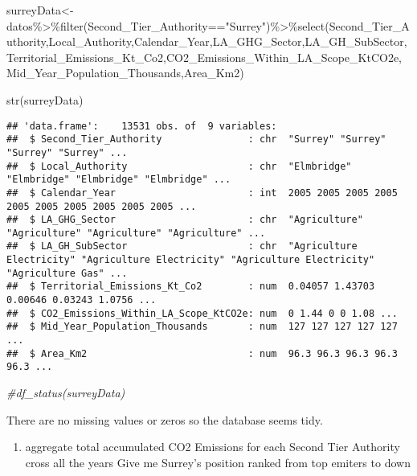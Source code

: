 \documentclass[
]{article}
\newenvironment{Shaded}{\begin{snugshade}}{\end{snugshade}}
\newcommand{\CommentTok}[1]{\textcolor[rgb]{0.56,0.35,0.01}{\textit{#1}}}
\newcommand{\FunctionTok}[1]{\textcolor[rgb]{0.00,0.00,0.00}{#1}}
\newcommand{\NormalTok}[1]{#1}
\newcommand{\OtherTok}[1]{\textcolor[rgb]{0.56,0.35,0.01}{#1}}
\newcommand{\SpecialCharTok}[1]{\textcolor[rgb]{0.00,0.00,0.00}{#1}}
\newcommand{\StringTok}[1]{\textcolor[rgb]{0.31,0.60,0.02}{#1}}
\providecommand{\tightlist}{%
  \setlength{\itemsep}{0pt}\setlength{\parskip}{0pt}}
\begin{document}
\begin{Shaded}
\begin{Highlighting}[]
\NormalTok{surreyData}\OtherTok{\textless{}{-}}\NormalTok{datos}\SpecialCharTok{\%\textgreater{}\%}\FunctionTok{filter}\NormalTok{(Second\_Tier\_Authority}\SpecialCharTok{==}\StringTok{"Surrey"}\NormalTok{)}\SpecialCharTok{\%\textgreater{}\%}\FunctionTok{select}\NormalTok{(Second\_Tier\_Authority,Local\_Authority,Calendar\_Year,LA\_GHG\_Sector,LA\_GH\_SubSector,Territorial\_Emissions\_Kt\_Co2,CO2\_Emissions\_Within\_LA\_Scope\_KtCO2e,Mid\_Year\_Population\_Thousands,Area\_Km2)}

\FunctionTok{str}\NormalTok{(surreyData)}
\end{Highlighting}
\end{Shaded}

\begin{verbatim}
## 'data.frame':    13531 obs. of  9 variables:
##  $ Second_Tier_Authority               : chr  "Surrey" "Surrey" "Surrey" "Surrey" ...
##  $ Local_Authority                     : chr  "Elmbridge" "Elmbridge" "Elmbridge" "Elmbridge" ...
##  $ Calendar_Year                       : int  2005 2005 2005 2005 2005 2005 2005 2005 2005 2005 ...
##  $ LA_GHG_Sector                       : chr  "Agriculture" "Agriculture" "Agriculture" "Agriculture" ...
##  $ LA_GH_SubSector                     : chr  "Agriculture Electricity" "Agriculture Electricity" "Agriculture Electricity" "Agriculture Gas" ...
##  $ Territorial_Emissions_Kt_Co2        : num  0.04057 1.43703 0.00646 0.03243 1.0756 ...
##  $ CO2_Emissions_Within_LA_Scope_KtCO2e: num  0 1.44 0 0 1.08 ...
##  $ Mid_Year_Population_Thousands       : num  127 127 127 127 127 ...
##  $ Area_Km2                            : num  96.3 96.3 96.3 96.3 96.3 ...
\end{verbatim}

\begin{Shaded}
\begin{Highlighting}[]
\CommentTok{\#df\_status(surreyData)}
\end{Highlighting}
\end{Shaded}

There are no missing values or zeros so the database seems tidy.

\begin{enumerate}
\def\labelenumi{\arabic{enumi})}
\setcounter{enumi}{1}
\tightlist
\item
  aggregate total accumulated CO2 Emissions for each Second Tier
  Authority cross all the years Give me Surrey's position ranked from
  top emiters to down
\end{enumerate}
\end{document}
